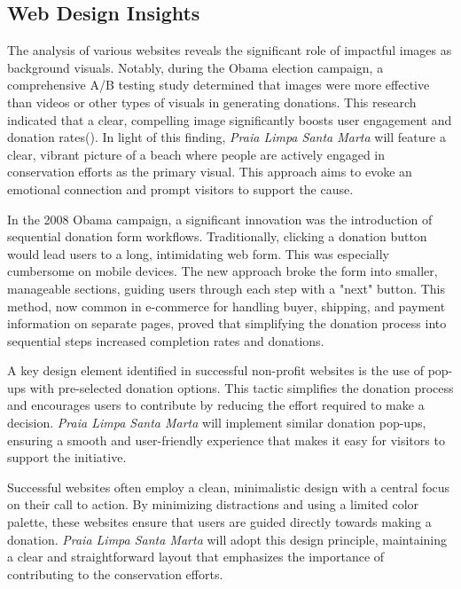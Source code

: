 \subsection{Web Design Insights}

The analysis of various websites reveals the significant role of impactful images as background visuals. Notably, during the Obama election campaign, a comprehensive A/B testing study determined that images were more effective than videos or other types of visuals in generating donations. This research indicated that a clear, compelling image significantly boosts user engagement and donation rates(\cite{kessler2012}). In light of this finding, \textit{Praia Limpa Santa Marta} will feature a clear, vibrant picture of a beach where people are actively engaged in conservation efforts as the primary visual. This approach aims to evoke an emotional connection and prompt visitors to support the cause.

In the 2008 Obama campaign, a significant innovation was the introduction of sequential donation form workflows. Traditionally, clicking a donation button would lead users to a long, intimidating web form. This was especially cumbersome on mobile devices. The new approach broke the form into smaller, manageable sections, guiding users through each step with a "next" button. This method, now common in e-commerce for handling buyer, shipping, and payment information on separate pages, proved that simplifying the donation process into sequential steps increased completion rates and donations.

A key design element identified in successful non-profit websites is the use of pop-ups with pre-selected donation options. This tactic simplifies the donation process and encourages users to contribute by reducing the effort required to make a decision. \textit{Praia Limpa Santa Marta} will implement similar donation pop-ups, ensuring a smooth and user-friendly experience that makes it easy for visitors to support the initiative.

Successful websites often employ a clean, minimalistic design with a central focus on their call to action. By minimizing distractions and using a limited color palette, these websites ensure that users are guided directly towards making a donation. \textit{Praia Limpa Santa Marta} will adopt this design principle, maintaining a clear and straightforward layout that emphasizes the importance of contributing to the conservation efforts.

